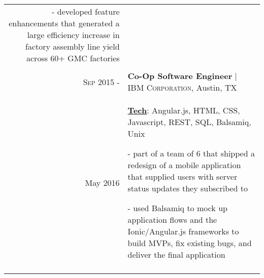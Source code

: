 \documentclass[a4paper,10pt]{article}
\begin{document}
\begin{tabular}{r|p{12cm}}
{	- developed feature enhancements that generated a large efficiency increase in factory assembly line yield across 60+ GMC factories 
} \\
 \multicolumn{2}{c}{} \\
 
 \textsc{Sep 2015 -} & \textbf{Co-Op Software Engineer} | \textsc{IBM Corporation}, Austin, TX \\
 May 2016 & \small{
 	\textbf{\underline{Tech}}: Angular.js, HTML, CSS, Javascript, REST, SQL, Balsamiq, Unix}
 
	\tiny{
	\vphantom{a}
	}
	
	\small{
	- part of a team of 6 that shipped a redesign of a mobile application that supplied users with server status updates they subscribed to
	
 	- used Balsamiq to mock up application flows and the Ionic/Angular.js frameworks to build MVPs, fix existing bugs, and deliver the final application

 } \\
 \multicolumn{2}{c}{} \\
\end{tabular}
\end{document}
